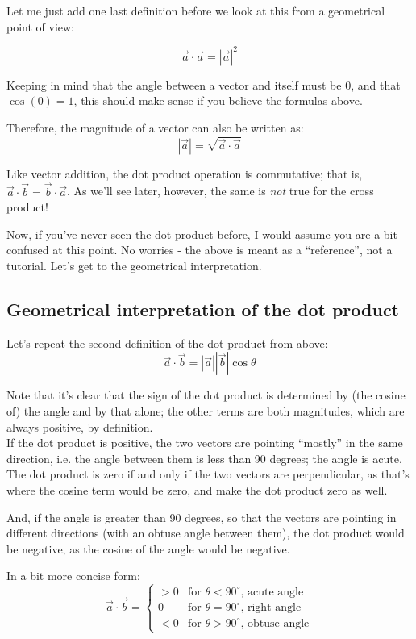 \documentclass[12pt,a4paper]{report}
\begin{document}
Let me just add one last definition before we look at this from a geometrical point of view:

\[ \vec{a} \cdot \vec{a} = |\vec{a}|^2 \]

Keeping in mind that the angle between a vector and itself must be 0, and that $\cos{(0)} = 1$, this should make sense if you believe the formulas above.

Therefore, the magnitude of a vector can also be written as:
\[ |\vec{a}| = \sqrt{\vec{a} \cdot \vec{a}} \]

Like vector addition, the dot product operation is commutative; that is, $\vec{a} \cdot \vec{b} = \vec{b} \cdot \vec{a}$. As we'll see later, however, the same is \emph{not} true for the cross product!

Now, if you've never seen the dot product before, I would assume you are a bit confused at this point. No worries - the above is meant as a ``reference'', not a tutorial. Let's get to the geometrical interpretation.

\subsection{Geometrical interpretation of the dot product}
Let's repeat the second definition of the dot product from above:
\[ \vec{a} \cdot \vec{b} = |\vec{a}| |\vec{b}| \cos{\theta} \]

Note that it's clear that the sign of the dot product is determined by (the cosine of) the angle and by that alone; the other terms are both magnitudes, which are always positive, by definition.\\
If the dot product is positive, the two vectors are pointing ``mostly'' in the same direction, i.e. the angle between them is less than 90 degrees; the angle is acute.
The dot product is zero if and only if the two vectors are perpendicular, as that's where the cosine term would be zero, and make the dot product zero as well.

And, if the angle is greater than 90 degrees, so that the vectors are pointing in different directions (with an obtuse angle between them), the dot product would be negative, as the cosine of the angle would be negative.

In a bit more concise form:
\[
\vec{a} \cdot \vec{b} =
	\begin{cases*}
	> 0 & \text{for $\theta < 90^\circ$, acute angle} \\
	  0 & \text{for $\theta = 90^\circ$, right angle} \\
	< 0 & \text{for $\theta > 90^\circ$, obtuse angle}
	\end{cases*}
\]
\end{document}
